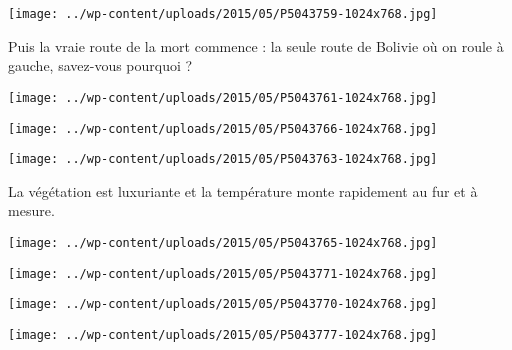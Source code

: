  

\begin{center} \texttt{[image: ../wp-content/uploads/2015/05/P5043759-1024x768.jpg]} \end{center}

 

 Puis la vraie route de la mort commence : la seule route de Bolivie où on roule à gauche, savez-vous pourquoi ? 

 

\begin{center} \texttt{[image: ../wp-content/uploads/2015/05/P5043761-1024x768.jpg]} \end{center}

 

 

\begin{center} \texttt{[image: ../wp-content/uploads/2015/05/P5043766-1024x768.jpg]} \end{center}

 

 

\begin{center} \texttt{[image: ../wp-content/uploads/2015/05/P5043763-1024x768.jpg]} \end{center}

 

 La végétation est luxuriante et la température monte rapidement au fur et à mesure. 

 

\begin{center} \texttt{[image: ../wp-content/uploads/2015/05/P5043765-1024x768.jpg]} \end{center}

 

 

\begin{center} \texttt{[image: ../wp-content/uploads/2015/05/P5043771-1024x768.jpg]} \end{center}

 

 

\begin{center} \texttt{[image: ../wp-content/uploads/2015/05/P5043770-1024x768.jpg]} \end{center}

 

 

\begin{center} \texttt{[image: ../wp-content/uploads/2015/05/P5043777-1024x768.jpg]} \end{center}

